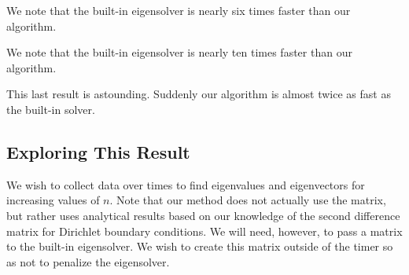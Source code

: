 \documentclass[12pt,]{book}
\newenvironment{Shaded}{}{}
\newcommand{\DecValTok}[1]{\textcolor[rgb]{0.25,0.63,0.44}{{#1}}}
\newcommand{\FloatTok}[1]{\textcolor[rgb]{0.25,0.63,0.44}{{#1}}}
\newcommand{\StringTok}[1]{\textcolor[rgb]{0.25,0.44,0.63}{{#1}}}
\newcommand{\CommentTok}[1]{\textcolor[rgb]{0.38,0.63,0.69}{\textit{{#1}}}}
\newcommand{\OperatorTok}[1]{\textcolor[rgb]{0.40,0.40,0.40}{{#1}}}
\newcommand{\NormalTok}[1]{{#1}}
\begin{document}
We note that the built-in eigensolver is nearly six times faster than
our algorithm.

\begin{Shaded}
\end{Shaded}

We note that the built-in eigensolver is nearly ten times faster than
our algorithm.

\begin{Shaded}
\end{Shaded}

This last result is astounding. Suddenly our algorithm is almost twice
as fast as the built-in solver.

\vfill

\pagebreak

\subsection{Exploring This Result}\label{exploring-this-result}

We wish to collect data over times to find eigenvalues and eigenvectors
for increasing values of \(n\). Note that our method does not actually
use the matrix, but rather uses analytical results based on our
knowledge of the second difference matrix for Dirichlet boundary
conditions. We will need, however, to pass a matrix to the built-in
eigensolver. We wish to create this matrix outside of the timer so as
not to penalize the eigensolver.
\end{document}
